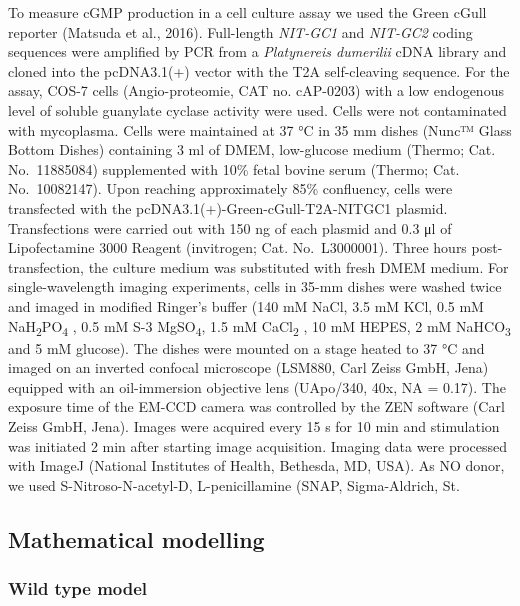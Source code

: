 \documentclass[
  10pt,
  onecolumn]{article}
\begin{document}
To measure cGMP production in a cell culture assay we used the Green
cGull reporter (Matsuda et al., 2016). Full-length \emph{NIT-GC1} and
\emph{NIT-GC2} coding sequences were amplified by PCR from a
\emph{Platynereis dumerilii} cDNA library and cloned into the
pcDNA3.1(+) vector with the T2A self-cleaving sequence. For the assay,
COS-7 cells (Angio-proteomie, CAT no. cAP-0203) with a low endogenous
level of soluble guanylate cyclase activity were used. Cells were not
contaminated with mycoplasma. Cells were maintained at 37 °C in 35 mm
dishes (Nunc™ Glass Bottom Dishes) containing 3 ml of DMEM, low-glucose
medium (Thermo; Cat. No.~11885084) supplemented with 10\% fetal bovine
serum (Thermo; Cat. No.~10082147). Upon reaching approximately 85\%
confluency, cells were transfected with the
pcDNA3.1(+)-Green-cGull-T2A-NITGC1 plasmid. Transfections were carried
out with 150 ng of each plasmid and 0.3 μl of Lipofectamine 3000 Reagent
(invitrogen; Cat. No.~L3000001). Three hours post-transfection, the
culture medium was substituted with fresh DMEM medium. For
single-wavelength imaging experiments, cells in 35-mm dishes were washed
twice and imaged in modified Ringer's buffer (140 mM NaCl, 3.5 mM KCl,
0.5 mM NaH\textsubscript{2}PO\textsubscript{4} , 0.5 mM S-3
MgSO\textsubscript{4}, 1.5 mM CaCl\textsubscript{2} , 10 mM HEPES, 2 mM
NaHCO\textsubscript{3} and 5 mM glucose). The dishes were mounted on a
stage heated to 37 °C and imaged on an inverted confocal microscope
(LSM880, Carl Zeiss GmbH, Jena) equipped with an oil-immersion objective
lens (UApo/340, 40x, NA = 0.17). The exposure time of the EM-CCD camera
was controlled by the ZEN software (Carl Zeiss GmbH, Jena). Images were
acquired every 15 s for 10 min and stimulation was initiated 2 min after
starting image acquisition. Imaging data were processed with ImageJ
(National Institutes of Health, Bethesda, MD, USA). As NO donor, we used
S-Nitroso-N-acetyl-D, L-penicillamine (SNAP, Sigma-Aldrich, St.

\hypertarget{mathematical-modelling}{%
\subsection{Mathematical modelling}\label{mathematical-modelling}}

\hypertarget{wild-type-model}{%
\subsubsection{Wild type model}\label{wild-type-model}}
\end{document}
